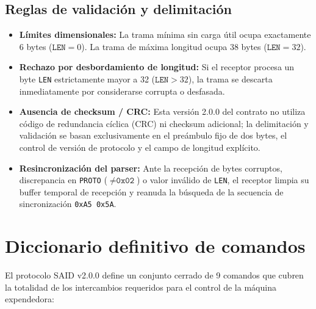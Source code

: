 \documentclass[a4paper,11pt]{article}
\begin{document}
\subsection{Reglas de validación y delimitación}

\begin{itemize}[leftmargin=1.6em]
    \item \textbf{Límites dimensionales:} La trama mínima sin carga útil ocupa exactamente 6 bytes ($\texttt{LEN} = 0$). La trama de máxima longitud ocupa 38 bytes ($\texttt{LEN} = 32$).
    \item \textbf{Rechazo por desbordamiento de longitud:} Si el receptor procesa un byte \texttt{LEN} estrictamente mayor a 32 ($\texttt{LEN} > 32$), la trama se descarta inmediatamente por considerarse corrupta o desfasada.
    \item \textbf{Ausencia de checksum / CRC:} Esta versión 2.0.0 del contrato no utiliza código de redundancia cíclica (CRC) ni checksum adicional; la delimitación y validación se basan exclusivamente en el preámbulo fijo de dos bytes, el control de versión de protocolo y el campo de longitud explícito.
    \item \textbf{Resincronización del parser:} Ante la recepción de bytes corruptos, discrepancia en \texttt{PROTO} ($\neq \texttt{0x02}$) o valor inválido de \texttt{LEN}, el receptor limpia su buffer temporal de recepción y reanuda la búsqueda de la secuencia de sincronización \texttt{0xA5 0x5A}.
\end{itemize}



\clearpage
\section{Diccionario definitivo de comandos}

El protocolo SAID v2.0.0 define un conjunto cerrado de 9 comandos que cubren la
totalidad de los intercambios requeridos para el control de la máquina expendedora:
\end{document}

